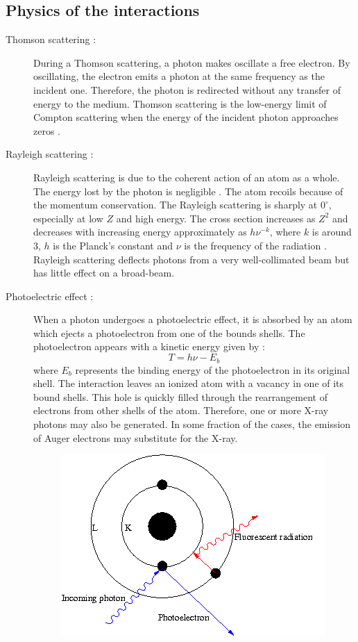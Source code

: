 \subsection{Physics of the interactions}

\begin{description}
\item [Thomson scattering :] During a Thomson scattering, a photon makes
oscillate a free electron. By oscillating, the electron emits a photon at the
same frequency as the incident one. Therefore, the photon is redirected
without any transfer of energy to the medium. Thomson scattering is the
low-energy limit of Compton scattering when the energy of the incident photon
approaches zeros \cite{radiation}.
\item [Rayleigh scattering :] Rayleigh scattering is due to the coherent
action of an atom as a whole. The energy lost by the photon is negligible
\cite{radiation}. The atom recoils because of the momentum conservation. The
Rayleigh scattering is sharply at $0^{\circ}$, especially at low $Z$ and high
energy. The cross section increases as $Z^2$ and decreases with increasing
energy approximately as $h\nu^{-k}$, where $k$ is around 3, $h$ is the
Planck's constant and $\nu$ is the frequency of the radiation \cite{shielding}.
Rayleigh scattering deflects photons from a very well-collimated beam but has
little effect on a broad-beam.
\item [Photoelectric effect :] When a photon undergoes a photoelectric
effect, it is absorbed by an atom which ejects a photoelectron from one of the
bounds shells. The photoelectron appears with a kinetic energy given by :
\begin{equation}
T = h\nu -E_b
\end{equation}
where $E_b$ represents the binding energy of the photoelectron in its original
shell.
The interaction leaves an ionized atom with a vacancy in one
of its bound shells. This hole is quickly filled through the rearrangement of
electrons from other shells of the atom. Therefore, one or more X-ray photons
may also be generated. In some fraction of the cases, the emission of Auger
electrons may substitute for the X-ray. 
\begin{figure}[H]
\centering
\includegraphics[width=0.5\linewidth]{./Cross_Sections/images/photoelectric}

\end{figure}
\end{description}
